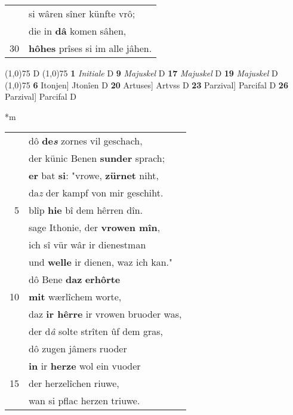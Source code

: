 \documentclass[8pt,a4paper,notitlepage]{article}
\begin{document}
\begin{table}[ht]
\begin{minipage}[t]{0.5\linewidth}
\begin{tabular}{rl}
 & si wâren sîner künfte vrô;\\ 
 & die in \textbf{dâ} komen sâhen,\\ 
30 & \textbf{hôhes} prîses si im alle jâhen.\\ 
\end{tabular}
\scriptsize
\line(1,0){75} \newline
D \newline
\line(1,0){75} \newline
\textbf{1} \textit{Initiale} D  \textbf{9} \textit{Majuskel} D  \textbf{17} \textit{Majuskel} D  \textbf{19} \textit{Majuskel} D  \newline
\line(1,0){75} \newline
\textbf{6} Itonjen] Jtonîen D \textbf{20} Artuses] Artvss D \textbf{23} Parzival] Parcifal D \textbf{26} Parzival] Parcifal D \newline
\end{minipage}
\hspace{0.5cm}
\begin{minipage}[t]{0.5\linewidth}
\small
\begin{center}*m
\end{center}
\begin{tabular}{rl}
 & dô \textbf{de\textit{s}} zornes vil geschach,\\ 
 & der künic Benen \textbf{sunder} sprach;\\ 
 & \textbf{er} bat \textbf{si}: "vrowe, \textbf{zürnet} niht,\\ 
 & da\textit{z} der kampf von mir geschiht.\\ 
5 & blîp \textbf{hie} bî dem hêrren dîn.\\ 
 & sage Ithonie, der \textbf{vrowen mîn},\\ 
 & ich sî vür wâr ir dienestman\\ 
 & und \textbf{welle} ir dienen, waz ich kan."\\ 
 & dô Bene \textbf{daz} \textbf{erhôrte}\\ 
10 & \textbf{mit} wærlîchem worte,\\ 
 & daz \textbf{ir hêrre} ir vrowen bruoder was,\\ 
 & der d\textit{â} solte strîten ûf dem gras,\\ 
 & dô zugen jâmers ruoder\\ 
 & \textbf{in} ir \textbf{herze} wol ein vuoder\\ 
15 & der herzelîchen riuwe,\\ 
 & wan si pflac herzen triuwe.\\ 

\end{tabular}
\end{minipage}
\end{table}
\end{document}
